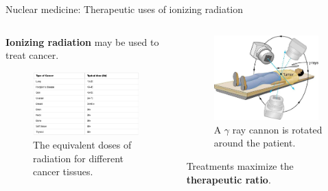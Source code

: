 \documentclass{beamer}
\begin{document}
\begin{frame}{Nuclear medicine: Therapeutic uses of ionizing radiation}
\begin{columns}[T]
\begin{column}{0.7\textwidth}
\footnotesize
\textbf{\alert{Ionizing radiation}} may be used to treat cancer.
\begin{figure}
\centering
\includegraphics[width=0.95\textwidth]{figures/radiation_therapy.png}
\caption{\label{fig:radiation_dose_eq} The equivalent doses of radiation for different cancer tissues.}
\end{figure}
\end{column}
\begin{column}{0.3\textwidth}
\footnotesize
\begin{figure}
\centering
\includegraphics[width=0.95\textwidth]{figures/radiation_treatment.png}
\caption{\label{fig:treatment_2} \footnotesize A $\gamma$ ray cannon is rotated around the patient.}
\end{figure}
Treatments maximize the \textbf{therapeutic ratio}.
\end{column}
\end{columns}
\end{frame}
\end{document}
